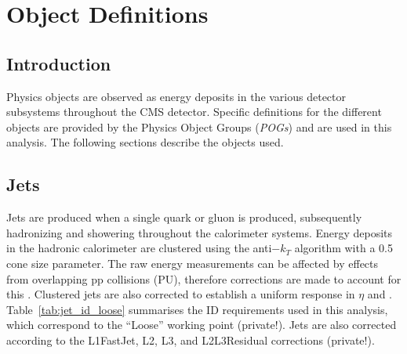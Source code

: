 \chapter{Object Definitions}

\ifpdf
    \graphicspath{{Chapter4/Figs/Raster/}{Chapter4/Figs/PDF/}{Chapter4/Figs/}}
\else
    \graphicspath{{Chapter4/Figs/Vector/}{Chapter4/Figs/}}
\fi


\section{Introduction}  %
\label{sec:objects_introduction}

Physics objects are observed as energy deposits in the various detector 
subsystems throughout the CMS detector. Specific definitions for the different 
objects are provided by the Physics Object Groups (\emph{POGs}) and are used in this 
analysis. The following sections describe the objects used.


\section{Jets}  %
\label{sec:objects_jets}

Jets are produced when a single quark or gluon is produced, subsequently 
hadronizing and showering throughout the calorimeter systems. Energy deposits in
the hadronic calorimeter are clustered using the anti$-k_T$ algorithm \cite{antikt} with
a 0.5 cone size parameter. The raw energy measurements can be affected by 
effects from overlapping pp collisions (PU), therefore corrections are made to account for this \cite{Cacciari2008119, 1126-6708-2008-04-005}. Clustered jets 
are also corrected to establish a uniform response in $\eta$ and \Pt
\cite{Chatrchyan:2011ds}.
Table~\ref{tab:jet_id_loose} summarises the ID requirements used in this 
analysis, which correspond to the ``Loose'' working point \cite{ref:jet-id} (private!). Jets are also 
corrected according to the L1FastJet, L2, L3, and L2L3Residual corrections
\cite{ref:jet-jes} (private!).

